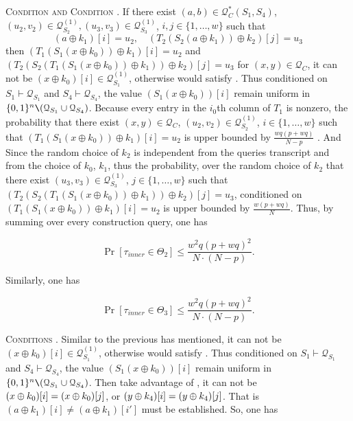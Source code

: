 \noindent \textsc{Condition \ctwo and Condition \cthree}. If there exist $(a, b) \in \mathcal{Q}_{C}^{*}\left(S_{1}, S_{4}\right)$, $(u_{2},v_{2}) \in \mathcal{Q}_{S_{2}}^{(1)}, (u_{3}, v_{3}) \in \mathcal{Q}_{S_{3}}^{(1)}$, $i, j \in\{1, \ldots, w\}$ such that 
$$\left(a \oplus k_{1}\right)[i]=u_2 ,  \quad \left(T_{2}\left(S_{2}\left(a \oplus k_{1}\right)\right) \oplus k_{2}\right)[j] = u_3$$
 \noindent then $\left(T_{1}\left(S_{1}\left(x \oplus k_{0}\right)\right) \oplus k_{1}\right)[i]=u_2$ and $\left(T_{2}\left(S_{2}\left(T_{1}\left(S_{1}\left(x \oplus k_{0}\right)\right) \oplus k_{1}\right)\right) \oplus k_{2}\right)[j]=u_{3}$ for $(x, y) \in \mathcal{Q}_{C}$, it can not be $\left(x \oplus k_{0}\right)[i] \in \mathcal{Q}_{S_{1}}^{(1)}$, otherwise would satisfy \btwo. Thus conditioned on $S_{1} \vdash \mathcal{Q}_{S_{1}}$ and $S_{4} \vdash \mathcal{Q}_{S_{4}}$, the value $\left(S_{1}\left(x \oplus k_{0}\right)\right)[i]$ remain uniform in $\{0, 1\}^{n} \verb|\| (\mathcal{Q}_{S_{1}} \cup \mathcal{Q}_{S_{4}})$. Because every entry in the $i_{0}$th column of $T_{1}$ is nonzero, the probability that there exist $(x, y) \in \mathcal{Q}_{C}$, $(u_{2}, v_{2}) \in \mathcal{Q}_{S_{2}}^{(1)}$, $i \in\{1, \ldots, w\}$ such that $\left(T_{1}\left(S_{1}\left(x \oplus k_{0}\right)\right) \oplus k_{1}\right)[i]=u_2$ is upper bounded by $\frac{w q (p+w q)}{N-p}$ . And Since the random choice of $k_{2}$ is independent from the queries transcript and from the choice of $k_{0}$, $k_{1}$, thus the probability, over the random choice of $k_{2}$ that there exist $(u_{3}, v_{3}) \in \mathcal{Q}_{S_{3}}^{(1)}$, $j \in\{1, \ldots, w\}$ such that $\left(T_{2}\left(S_{2}\left(T_{1}\left(S_{1}\left(x \oplus k_{0}\right)\right) \oplus k_{1}\right)\right) \oplus k_{2}\right)[j]=u_{3}$, conditioned on $\left(T_{1}\left(S_{1}\left(x \oplus k_{0}\right)\right) \oplus k_{1}\right)[i]=u_2$ is upper bounded by $\frac{w (p+w q)}{N}$. Thus, by summing over every construction query, one has

$$
\operatorname{Pr}\left[\tau_{inner} \in \Theta_{2}\right] \leq \frac{w^{2} q (p+w q)^{2}}{N \cdot (N-p)}.
$$

\noindent Similarly, one has

$$
\operatorname{Pr}\left[\tau_{inner} \in \Theta_{3}\right] \leq \frac{w^{2} q (p+w q)^{2}}{N \cdot (N-p)}.
$$

\noindent \textsc{Conditions \cfour}. Similar to the previous has mentioned, it can not be $\left(x \oplus k_{0}\right)[i] \in \mathcal{Q}_{S_{1}}^{(1)}$, otherwise would satisfy \btwo. Thus conditioned on $S_{1} \vdash \mathcal{Q}_{S_{1}}$ and $S_{4} \vdash \mathcal{Q}_{S_{4}}$, the value $\left(S_{1}\left(x \oplus k_{0}\right)\right)[i]$ remain uniform in $\{0, 1\}^{n} \verb|\| (\mathcal{Q}_{S_{1}} \cup \mathcal{Q}_{S_{4}})$. Then take advantage of \bfour, it can not be $(x\oplus k_0)[i]=(x\oplus k_0)[j]$, or $(y\oplus k_4)[i]=(y\oplus k_4)[j]$. That is $\left(a \oplus k_{1}\right)[i] \neq \left(a \oplus k_{1}\right)[i']$ must be established. So, one has

